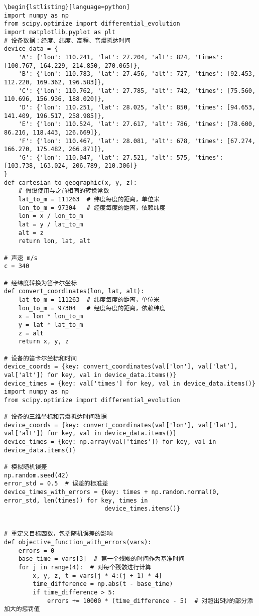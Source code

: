 \documentclass[withoutpreface,bwprint,12pt,a4paper]{cumcmthesis}
\begin{document}
\begin{appendices}
\begin{lstlisting}
\begin{lstlisting}[language=python]
import numpy as np
from scipy.optimize import differential_evolution
import matplotlib.pyplot as plt
# 设备数据：经度、纬度、高程、音爆抵达时间
device_data = {
    'A': {'lon': 110.241, 'lat': 27.204, 'alt': 824, 'times': [100.767, 164.229, 214.850, 270.065]},
    'B': {'lon': 110.783, 'lat': 27.456, 'alt': 727, 'times': [92.453, 112.220, 169.362, 196.583]},
    'C': {'lon': 110.762, 'lat': 27.785, 'alt': 742, 'times': [75.560, 110.696, 156.936, 188.020]},
    'D': {'lon': 110.251, 'lat': 28.025, 'alt': 850, 'times': [94.653, 141.409, 196.517, 258.985]},
    'E': {'lon': 110.524, 'lat': 27.617, 'alt': 786, 'times': [78.600, 86.216, 118.443, 126.669]},
    'F': {'lon': 110.467, 'lat': 28.081, 'alt': 678, 'times': [67.274, 166.270, 175.482, 266.871]},
    'G': {'lon': 110.047, 'lat': 27.521, 'alt': 575, 'times': [103.738, 163.024, 206.789, 210.306]}
}
def cartesian_to_geographic(x, y, z):
    # 假设使用与之前相同的转换常数
    lat_to_m = 111263  # 纬度每度的距离，单位米
    lon_to_m = 97304   # 经度每度的距离，依赖纬度
    lon = x / lon_to_m
    lat = y / lat_to_m
    alt = z
    return lon, lat, alt

# 声速 m/s
c = 340

# 经纬度转换为笛卡尔坐标
def convert_coordinates(lon, lat, alt):
    lat_to_m = 111263  # 纬度每度的距离，单位米
    lon_to_m = 97304   # 经度每度的距离，依赖纬度
    x = lon * lon_to_m
    y = lat * lat_to_m
    z = alt
    return x, y, z

# 设备的笛卡尔坐标和时间
device_coords = {key: convert_coordinates(val['lon'], val['lat'], val['alt']) for key, val in device_data.items()}
device_times = {key: val['times'] for key, val in device_data.items()}
import numpy as np
from scipy.optimize import differential_evolution

# 设备的三维坐标和音爆抵达时间数据
device_coords = {key: convert_coordinates(val['lon'], val['lat'], val['alt']) for key, val in device_data.items()}
device_times = {key: np.array(val['times']) for key, val in device_data.items()}

# 模拟随机误差
np.random.seed(42)
error_std = 0.5  # 误差的标准差
device_times_with_errors = {key: times + np.random.normal(0, error_std, len(times)) for key, times in
                            device_times.items()}


# 重定义目标函数，包括随机误差的影响
def objective_function_with_errors(vars):
    errors = 0
    base_time = vars[3]  # 第一个残骸的时间作为基准时间
    for j in range(4):  # 对每个残骸进行计算
        x, y, z, t = vars[j * 4:(j + 1) * 4]
        time_difference = np.abs(t - base_time)
        if time_difference > 5:
            errors += 10000 * (time_difference - 5)  # 对超出5秒的部分添加大的惩罚值


\end{lstlisting}
\end{appendices}
\end{document}

